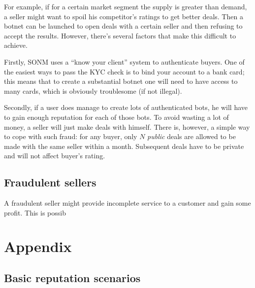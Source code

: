 \documentclass[11pt]{article}
\begin{document}
For example, if for a certain market segment the supply is greater than demand, a seller might want to spoil his competitor's ratings to get better deals. Then a botnet can be launched to open deals with a certain seller and then refusing to accept the results. However, there's several factors that make this difficult to achieve.

Firstly, SONM uses a ``know your client'' system to authenticate buyers. One of the easiest ways to pass the KYC check is to bind your account to a bank card; this means that to create a substantial botnet one will need to have access to many cards, which is obviously troublesome (if not illegal).

Secondly, if a user does manage to create lots of authenticated bots, he will have to gain enough reputation for each of those bots. To avoid wasting a lot of money, a seller will just make deals with himself. There is, however, a simple way to cope with such fraud: for any buyer, only $ N $ \textit{public} deals are allowed to be made with the same seller within a month. Subsequent deals have to be private and will not affect buyer's rating.

\subsection{Fraudulent sellers}

A fraudulent seller might provide incomplete service to a customer and gain some profit. This is possib

\section{Appendix} \label{appendix}

\subsection{Basic reputation scenarios} \label{appendix:basicReputation}
\end{document}
